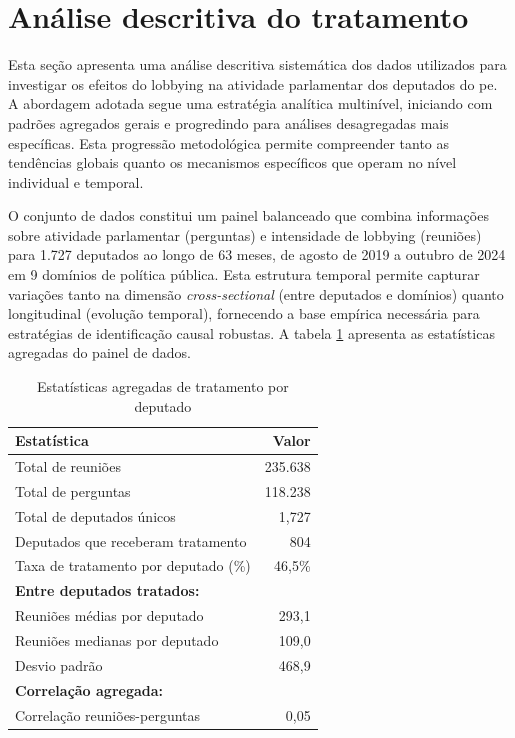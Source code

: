 \section{Análise descritiva do tratamento}
\label{sec:resultados_descritica}

Esta seção apresenta uma análise descritiva sistemática dos dados utilizados para investigar os efeitos do lobbying na atividade parlamentar dos deputados do \acrshort{pe}. A abordagem adotada segue uma estratégia analítica multinível, iniciando com padrões agregados gerais e progredindo para análises desagregadas mais específicas. Esta progressão metodológica permite compreender tanto as tendências globais quanto os mecanismos específicos que operam no nível individual e temporal.

O conjunto de dados constitui um painel balanceado que combina informações sobre atividade parlamentar (perguntas) e intensidade de lobbying (reuniões) para 1.727 deputados ao longo de 63 meses, de agosto de 2019 a outubro de 2024 em 9 domínios de política pública. Esta estrutura temporal permite capturar variações tanto na dimensão \textit{cross-sectional} (entre deputados e domínios) quanto longitudinal (evolução temporal), fornecendo a base empírica necessária para estratégias de identificação causal robustas. A tabela \ref{tab:mep_treatment_stats} apresenta as estatísticas agregadas do painel de dados.

\begin{table}[htbp]
    \centering
    \caption{Estatísticas agregadas de tratamento por deputado}
    \label{tab:mep_treatment_stats}
    \begin{tabular}{lr}
    \toprule
    \textbf{Estatística} & \textbf{Valor} \\
    \midrule
    Total de reuniões & 235.638 \\
    Total de perguntas & 118.238 \\
    Total de deputados únicos & 1{,}727 \\
    Deputados que receberam tratamento & 804 \\
    Taxa de tratamento por deputado (\%) & 46{,}5\% \\
    \midrule
    \textbf{Entre deputados tratados:} & \\
    Reuniões médias por deputado & 293{,}1 \\
    Reuniões medianas por deputado & 109{,}0 \\
    Desvio padrão & 468{,}9 \\
    \midrule
    \textbf{Correlação agregada:} & \\
    Correlação reuniões-perguntas & 0{,}05 \\
    \bottomrule
    \end{tabular}
\end{table}

